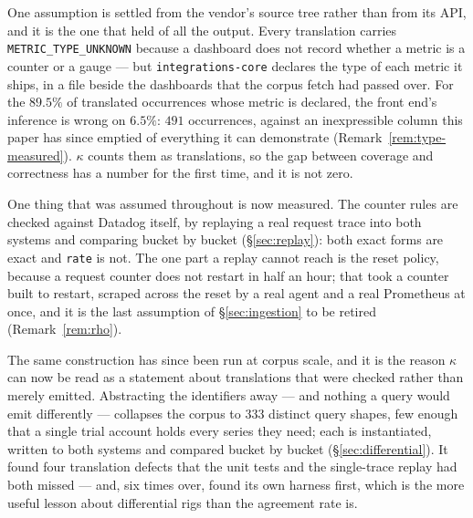 One assumption is settled from the vendor's source tree rather than from its API, and
it is the one that held of all the output. Every translation carries
\texttt{METRIC\_TYPE\_UNKNOWN} because a dashboard does not record whether a metric is
a counter or a gauge --- but \texttt{integrations-core} declares the type of each
metric it ships, in a file beside the dashboards that the corpus fetch had passed over.
For the $89.5\%$ of translated occurrences whose metric is declared, the front end's
inference is wrong on $6.5\%$: $491$ occurrences, against an inexpressible column this
paper has since emptied of everything it can demonstrate
(Remark~\ref{rem:type-measured}). $\kappa$ counts them as
translations, so the gap between coverage and correctness has a number for the first
time, and it is not zero.

One thing that was assumed throughout is now measured. The counter rules are checked
against Datadog itself, by replaying a real request trace into both systems and comparing
bucket by bucket (\S\ref{sec:replay}): both exact forms are exact and \texttt{rate} is
not. The one part a replay cannot reach is the reset policy, because a request counter
does not restart in half an hour; that took a counter built to restart, scraped across
the reset by a real agent and a real Prometheus at once, and it is the last assumption of
\S\ref{sec:ingestion} to be retired (Remark~\ref{rem:rho}).

The same construction has since been run at corpus scale, and it is the reason $\kappa$
can now be read as a statement about translations that were checked rather than merely
emitted. Abstracting the identifiers away --- and nothing a query would emit differently ---
collapses the corpus to $333$
distinct query shapes, few enough that a single trial account holds every series they
need; each is instantiated, written to both systems and compared bucket by bucket
(\S\ref{sec:differential}). It found four translation defects that the unit tests and the
single-trace replay had both missed --- and, six times over, found its own harness
first, which is the more useful lesson about differential rigs than the agreement rate
is.

